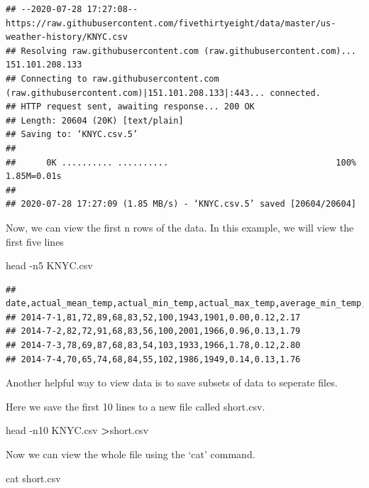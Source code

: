 \documentclass[]{book}
\newenvironment{Shaded}{\begin{snugshade}}{\end{snugshade}}
\newcommand{\FunctionTok}[1]{\textcolor[rgb]{0.00,0.00,0.00}{#1}}
\newcommand{\OperatorTok}[1]{\textcolor[rgb]{0.81,0.36,0.00}{\textbf{#1}}}
\newcommand{\NormalTok}[1]{#1}
\begin{document}
\begin{verbatim}
## --2020-07-28 17:27:08--  https://raw.githubusercontent.com/fivethirtyeight/data/master/us-weather-history/KNYC.csv
## Resolving raw.githubusercontent.com (raw.githubusercontent.com)... 151.101.208.133
## Connecting to raw.githubusercontent.com (raw.githubusercontent.com)|151.101.208.133|:443... connected.
## HTTP request sent, awaiting response... 200 OK
## Length: 20604 (20K) [text/plain]
## Saving to: ‘KNYC.csv.5’
## 
##      0K .......... ..........                                 100% 1.85M=0.01s
## 
## 2020-07-28 17:27:09 (1.85 MB/s) - ‘KNYC.csv.5’ saved [20604/20604]
\end{verbatim}

Now, we can view the first n rows of the data. In this example, we will
view the first five lines

\begin{Shaded}
\begin{Highlighting}[]
\FunctionTok{head}\NormalTok{ -n5 KNYC.csv}
\end{Highlighting}
\end{Shaded}

\begin{verbatim}
## date,actual_mean_temp,actual_min_temp,actual_max_temp,average_min_temp,average_max_temp,record_min_temp,record_max_temp,record_min_temp_year,record_max_temp_year,actual_precipitation,average_precipitation,record_precipitation
## 2014-7-1,81,72,89,68,83,52,100,1943,1901,0.00,0.12,2.17
## 2014-7-2,82,72,91,68,83,56,100,2001,1966,0.96,0.13,1.79
## 2014-7-3,78,69,87,68,83,54,103,1933,1966,1.78,0.12,2.80
## 2014-7-4,70,65,74,68,84,55,102,1986,1949,0.14,0.13,1.76
\end{verbatim}

Another helpful way to view data is to save subsets of data to seperate
files.

Here we save the first 10 lines to a new file called short.csv.

\begin{Shaded}
\begin{Highlighting}[]
\FunctionTok{head}\NormalTok{ -n10 KNYC.csv }\OperatorTok{>}\NormalTok{short.csv}
\end{Highlighting}
\end{Shaded}

Now we can view the whole file using the `cat' command.

\begin{Shaded}
\begin{Highlighting}[]
\FunctionTok{cat}\NormalTok{ short.csv}
\end{Highlighting}
\end{Shaded}
\end{document}
